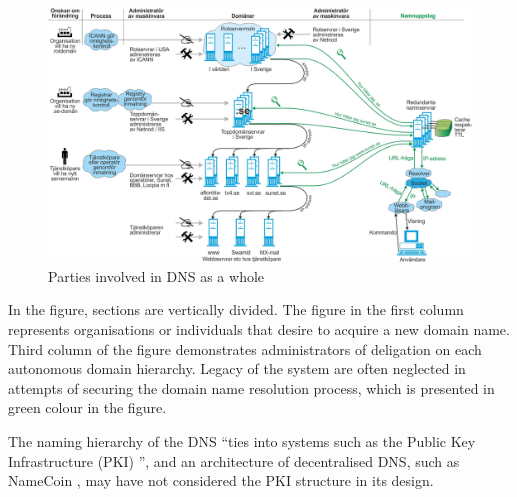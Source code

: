 \begin{figure}[h!]
    \begin{center}
    \includegraphics*[width=1\columnwidth]{img/DNS-maskinvara}
    \end{center}
    \caption{Parties involved in DNS as a whole \cite{SUNET-DNS}}
    \label{dnsactors}
\end{figure}

In the figure, sections are vertically divided.
The figure in the first column represents organisations or individuals that desire to acquire a new domain name.
Third column of the figure demonstrates administrators of deligation on each autonomous domain hierarchy.
Legacy of the system are often neglected in attempts of securing the domain name resolution process, which is presented in green colour in the figure. 

The naming hierarchy of the DNS ``ties into systems such as the Public Key Infrastructure (PKI) \cite{akamai-dns-architecture}'', and an architecture of decentralised DNS, such as NameCoin \cite{loibl2014namecoin}, may have not considered the PKI structure in its design.